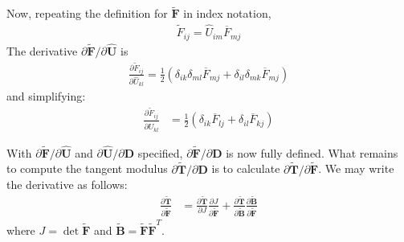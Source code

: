 Now, repeating the definition for $\tilde {\bm F}$ in index notation,
\begin{align}
\tilde{F}_{ij} = \hat{U}_{im}\overline{F}_{mj}
\end{align}
The derivative ${\partial \tilde{\bm F}}/{\partial \hat{\bm U}}$ is
\begin{align}
\frac{\partial \tilde{F}_{ij}}{\partial \hat{U}_{kl}} = \frac{1}{2}\left(\delta_{ik}\delta_{ml}\overline{F}_{mj} + \delta_{il}\delta_{mk}\overline{F}_{mj}\right)
\end{align}
and simplifying:
\begin{align}
\frac{\partial \tilde{F}_{ij}}{\partial \hat{U}_{kl}} &= \frac{1}{2}\left(\delta_{ik}\overline{F}_{lj} + \delta_{il}\overline{F}_{kj}\right)
\end{align}

With $\partial \tilde{\bm F}/\partial \hat{\bm U}$ and $\partial \hat{\bm U}/\partial {\bm D}$ specified, $\partial \tilde{\bm F}/\partial {\bm D}$ is now fully defined. What remains to compute the tangent modulus $\partial \tilde{\bm T}/\partial {\bm D}$ is to calculate $\partial \tilde{\bm T}/\partial \tilde {\bm F}$. We may write the derivative as follows:
\begin{align}
\frac{\partial \tilde{\bm T}}{\partial \tilde{\bm F}} &= \frac{\partial \tilde{\bm T}}{\partial J}\frac{\partial J}{\partial \tilde {\bm F}} + \frac{\partial \tilde{\bm T}}{\partial {\tilde{\bm {B}}}}\frac{\partial {\tilde{\bm {B}}}}{\partial \tilde {\bm F}}
\end{align}
where $J = \det\tilde{\bm{F}}$ and $\tilde{\bm{B}} = \tilde{\bm{F}}\tilde{\bm{F}}^T$.

